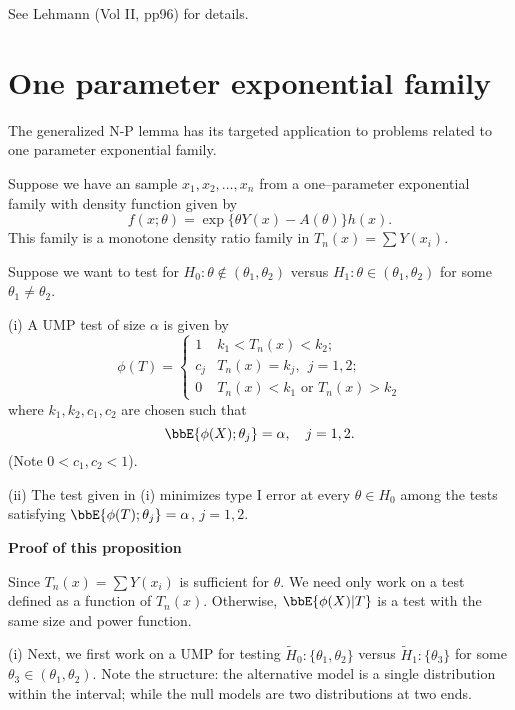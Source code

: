See Lehmann (Vol II, pp96) for details.

\section{One parameter exponential family}

The generalized N-P lemma has its targeted application
to problems related to one parameter exponential family.

\begin{theorem}
\label{Thm4.3}
Suppose we have an \iid sample $x_1, x_2, \ldots, x_n$ from a one--parameter
exponential family with density function given by
\[
f(x; \theta) = \exp \{ \theta Y(x) - A(\theta)\} h(x).
\]
This family is a monotone density ratio family in $T_n(x) = \sum Y(x_i)$.

Suppose we want to test for 
$H_0: \theta \not \in (\theta_1, \theta_2)$
versus $H_1: \theta  \in (\theta_1, \theta_2)$
for some $\theta_1 \neq \theta_2$.

\bi
\item[(i)] 
A UMP test of size $\alpha$ is given by
\[
\phi(T)
=
\left \{
\begin{array}{ll}
1  & k_1 < T_n(x)  < k_2;\\
c_j &   T_n(x) = k_j,~~ j=1, 2;\\
0  & T_n(x)  < k_1 \mbox{  or  } T_n(x)  > k_2
\end{array}
\right .
\]
where $k_1, k_2, c_1, c_2$ are chosen such that
\[
\bbE\{ \phi(X); \theta_j \} = \alpha, ~~~j=1, 2.
\]
(Note $ 0 < c_1, c_2 < 1 $).

\item[(ii)] 
The test given in (i) minimizes type I error
at every $\theta \in H_0$ among the tests
satisfying
$\bbE \{ \phi(T); \theta_j\} = \alpha$, $j=1, 2$.
\ei
\end{theorem}

\vs \vs \no
{\bf Proof of this proposition}

Since $T_n(x) = \sum Y(x_i)$ is sufficient for $\theta$.
We need only work on a test defined as a function of $T_n(x)$.
Otherwise, $\bbE\{ \phi(X)| T\}$ is a test with the same
size and power function.

(i) Next, we first work on a UMP for testing $\tilde H_0:
\{ \theta_1, \theta_2\}$ versus $\tilde H_1: \{\theta_3\}$
for some $\theta_3 \in (\theta_1, \theta_2)$.
Note the structure: the alternative model is a single
distribution within the interval; while the null models
are two distributions at two ends.

